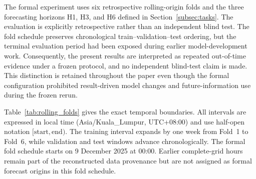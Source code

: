 \documentclass[pdflatex,sn-basic,Numbered]{sn-jnl}
\begin{document}
The formal experiment uses six retrospective rolling-origin folds and the three forecasting horizons H1, H3, and H6 defined in Section~\ref{subsec:tasks}. The evaluation is explicitly retrospective rather than an independent blind test. The fold schedule preserves chronological train--validation--test ordering, but the terminal evaluation period had been exposed during earlier model-development work. Consequently, the present results are interpreted as repeated out-of-time evidence under a frozen protocol, and no independent blind-test claim is made. This distinction is retained throughout the paper even though the formal configuration prohibited result-driven model changes and future-information use during the frozen rerun.

Table~\ref{tab:rolling_folds} gives the exact temporal boundaries. All intervals are expressed in local time (Asia/Kuala\_Lumpur, UTC+08:00) and use half-open notation $[\mathrm{start},\mathrm{end})$. The training interval expands by one week from Fold~1 to Fold~6, while validation and test windows advance chronologically. The formal fold schedule starts on 9 December 2025 at 00:00. Earlier complete-grid hours remain part of the reconstructed data provenance but are not assigned as formal forecast origins in this fold schedule.
\end{document}

